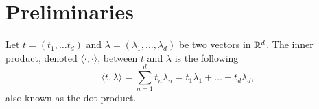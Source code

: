 \documentclass[../thesis.tex]{subfiles}
\begin{document}
\section{Preliminaries}

\begin{definition}\label{eq:dot_prod}
    Let $t=(t_1,\dots t_d)$ and $\lambda=(\lambda_1, \dots, \lambda_d)$ be two vectors in $\mathbb{R}^d$. The inner product, denoted $\langle \cdot, \cdot \rangle$, between $t$ and $\lambda$ is the following 
    \begin{equation}
        \langle t, \lambda \rangle = \sum_{n=1}^d t_n \lambda_n = t_1\lambda_1 + \dots + t_d\lambda_d,
    \end{equation}
    also known as the dot product. 
\end{definition}
\end{document}
